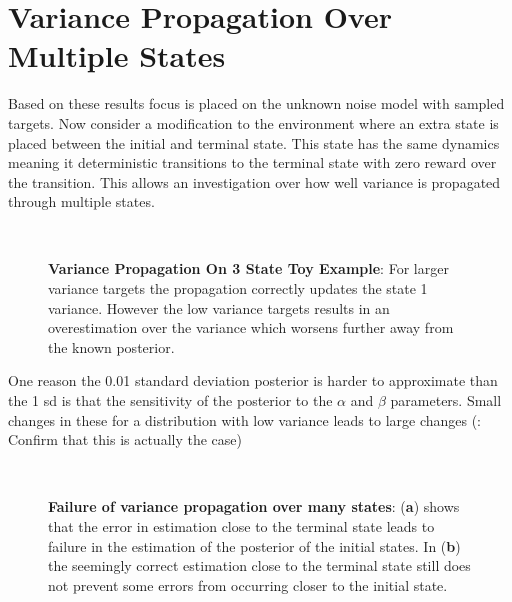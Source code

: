 \section{Variance Propagation Over Multiple States}


Based on these results focus is placed on the unknown noise model with sampled targets. Now consider a modification to the environment where an extra state is placed between the initial and terminal state. This state has the same dynamics meaning it deterministic transitions to the terminal state with zero reward over the transition. This allows an investigation over how well variance is propagated through multiple states.

\begin{figure}[H]
    \centering

    \\
    \caption{\textbf{Variance Propagation On 3 State Toy Example}: For larger variance targets the propagation correctly updates the state 1 variance. However the low variance targets results in an overestimation over the variance which worsens further away from the known posterior.}
    \label{fig:3stateproptest}
\end{figure}

One reason the 0.01 standard deviation posterior is harder to approximate than the 1 sd is that the sensitivity of the posterior to the $\alpha$ and $\beta$ parameters. Small changes in these for a distribution with low variance leads to large changes (\todo: Confirm that this is actually the case)


\begin{figure}[H]
    \centering
    \\

    \caption{\textbf{Failure of variance propagation over many states}: (\textbf{a}) shows that the error in estimation close to the terminal state leads to failure in the estimation of the posterior of the initial states. In (\textbf{b}) the seemingly correct estimation close to the terminal state still does not prevent some errors from occurring closer to the initial state.}
    \label{fig:longproptest}
\end{figure}


